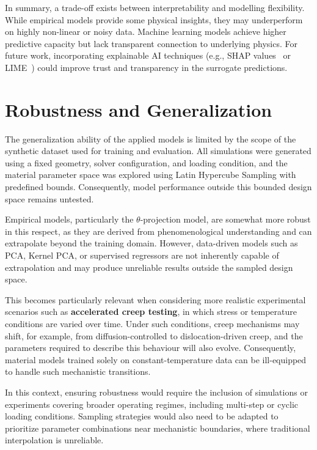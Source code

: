 \documentclass[class=scrbook, crop=false]{standalone}
\begin{document}
In summary, a trade-off exists between interpretability and modelling flexibility. While empirical models provide some physical insights, they may underperform on highly non-linear or noisy data. Machine learning models achieve higher predictive capacity but lack transparent connection to underlying physics. For future work, incorporating explainable AI techniques (e.g., SHAP values~\cite{lundberg2017unified} or LIME~\cite{ribeiro2016lime}) could improve trust and transparency in the surrogate predictions.

\section{Robustness and Generalization}
\label{Section::Discussion_Robustness}

The generalization ability of the applied models is limited by the scope of the synthetic dataset used for training and evaluation. All simulations were generated using a fixed geometry, solver configuration, and loading condition, and the material parameter space was explored using Latin Hypercube Sampling with predefined bounds. Consequently, model performance outside this bounded design space remains untested.

Empirical models, particularly the $\theta$-projection model, are somewhat more robust in this respect, as they are derived from phenomenological understanding and can extrapolate beyond the training domain. However, data-driven models such as PCA, Kernel PCA, or supervised regressors are not inherently capable of extrapolation and may produce unreliable results outside the sampled design space.

This becomes particularly relevant when considering more realistic experimental scenarios such as \textbf{accelerated creep testing}, in which stress or temperature conditions are varied over time. Under such conditions, creep mechanisms may shift, for example, from diffusion-controlled to dislocation-driven creep, and the parameters required to describe this behaviour will also evolve. Consequently, material models trained solely on constant-temperature data can be ill-equipped to handle such mechanistic transitions.

In this context, ensuring robustness would require the inclusion of simulations or experiments covering broader operating regimes, including multi-step or cyclic loading conditions. Sampling strategies would also need to be adapted to prioritize parameter combinations near mechanistic boundaries, where traditional interpolation is unreliable.
\end{document}
